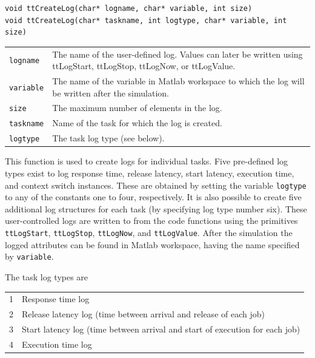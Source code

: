 \documentclass[final,twoside]{rapport}
\begin{document}
\Csyntax
\begin{verbatim}
void ttCreateLog(char* logname, char* variable, int size)
void ttCreateLog(char* taskname, int logtype, char* variable, int size)
\end{verbatim}

\args
\begin{tabularx}{\hsize}{l>{\raggedright\arraybackslash}X}
  {\tt logname} & The name of the user-defined log. Values can later
           be written using ttLogStart, ttLogStop, ttLogNow, or ttLogValue. \\
  {\tt variable} & The name of the variable in Matlab workspace to
  which the log will be written after the simulation. \\
  {\tt size} & The maximum number of elements in the log. \\
  {\tt taskname} & Name of the task for which the log is created.
\\
  {\tt logtype} & The task log type (see below). \\
\end{tabularx}

\descr This function is used to create logs for individual tasks. Five
pre-defined log types exist to log response time, release latency,
start latency, execution time, and context switch instances. These are
obtained by setting the variable \texttt{logtype} to any of the
constants one to four, respectively. It is also possible to create
five additional log structures for each task (by specifying log type
number six). These user-controlled logs are written to from the code
functions using the primitives {\tt ttLogStart}, {\tt ttLogStop}, 
{\tt ttLogNow}, and {\tt ttLogValue}. After the simulation the logged
attributes can be found in Matlab workspace, having the name specified by
\texttt{variable}.

The task log types are

\begin{tabularx}{\hsize}{l>{\raggedright\arraybackslash}X}
 1 & Response time log \\
 2  & Release latency log (time between arrival
   and release of each job) \\
 3  & Start latency log (time between arrival
                    and start of execution for each job) \\
 4  & Execution time log
\end{tabularx}
\end{document}
